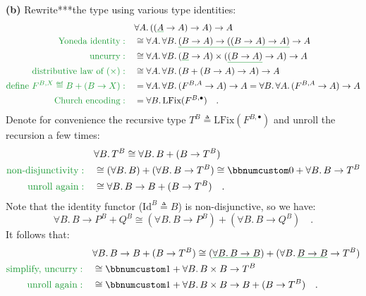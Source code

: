 \textbf{(b)} Rewrite{*}{*}{*}the type using various type identities:
\begin{align*}
 & \forall A.\,((\gunderline A\rightarrow A)\rightarrow A)\rightarrow A\\
{\color{greenunder}\text{Yoneda identity}:}\quad & \cong\forall A.\,\forall B.\,\gunderline{(B\rightarrow A)\rightarrow((B\rightarrow A)\rightarrow A)}\rightarrow A\\
{\color{greenunder}\text{uncurry}:}\quad & \cong\forall A.\,\forall B.\,(\gunderline B\rightarrow A)\times(\gunderline{(B\rightarrow A)}\rightarrow A)\rightarrow A\\
{\color{greenunder}\text{distributive law of }(\times):}\quad & \cong\forall A.\,\forall B.\,(B+(B\rightarrow A)\rightarrow A)\rightarrow A\\
{\color{greenunder}\text{define }F^{B,X}\triangleq B+(B\rightarrow X):}\quad & =\forall A.\,\forall B.\,(F^{B,A}\rightarrow A)\rightarrow A=\forall B.\,\forall A.\,(F^{B,A}\rightarrow A)\rightarrow A\\
{\color{greenunder}\text{Church encoding}:}\quad & =\forall B.\,\text{LFix}(F^{B,\bullet})\quad.
\end{align*}
Denote for convenience the recursive type $T^{B}\triangleq\text{LFix}(F^{B,\bullet})$
and unroll the recursion a few times:
\begin{align*}
 & \forall B.\,T^{B}\cong\forall B.\,B+(B\rightarrow T^{B})\\
{\color{greenunder}\text{non-disjunctivity}:}\quad & \cong(\forall B.\,B)+(\forall B.\,B\rightarrow T^{B})\cong\bbnum 0+\forall B.\,B\rightarrow T^{B}\\
{\color{greenunder}\text{unroll again}:}\quad & \cong\forall B.\,B\rightarrow B+(B\rightarrow T^{B})\quad.
\end{align*}
Note that the identity functor ($\text{Id}^{B}\triangleq B$) is non-disjunctive,
so we have:
\[
\forall B.\,B\rightarrow P^{B}+Q^{B}\cong(\forall B.\,B\rightarrow P^{B})+(\forall B.\,B\rightarrow Q^{B})\quad.
\]
It follows that:
\begin{align*}
 & \forall B.\,B\rightarrow B+(B\rightarrow T^{B})\cong(\gunderline{\forall B.\,B\rightarrow B})+(\forall B.\,\gunderline{B\rightarrow B}\rightarrow T^{B})\\
{\color{greenunder}\text{simplify, uncurry}:}\quad & \cong\bbnum 1+\forall B.\,B\times B\rightarrow T^{B}\\
{\color{greenunder}\text{unroll again}:}\quad & \cong\bbnum 1+\forall B.\,B\times B\rightarrow B+(B\rightarrow T^{B})\quad.
\end{align*}

